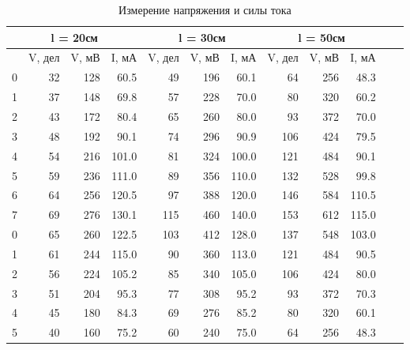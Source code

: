 \documentclass{article}
\begin{document}
\begin{table}[H]
    \label{tab:4}
    \begin{tabular}{|c|r|r|r|r|r|r|r|r|r|r|r|}
        \hline
        \multicolumn{4}{|c|}{l = 20см} & 
        \multicolumn{3}{|c|}{l = 30см} & 
        \multicolumn{3}{|c|}{l = 50см}                                                                            \\
        \hline
                                       & V, дел & V, мВ & I, мА & V, дел & V, мВ & I, мА & V, дел & V, мВ & I, мА \\
        \hline
        0                              & 32     & 128   & 60.5  & 49     & 196   & 60.1  & 64     & 256   & 48.3  \\
        1                              & 37     & 148   & 69.8  & 57     & 228   & 70.0  & 80     & 320   & 60.2  \\
        2                              & 43     & 172   & 80.4  & 65     & 260   & 80.0  & 93     & 372   & 70.0  \\
        3                              & 48     & 192   & 90.1  & 74     & 296   & 90.9  & 106    & 424   & 79.5  \\
        4                              & 54     & 216   & 101.0 & 81     & 324   & 100.0 & 121    & 484   & 90.1  \\
        5                              & 59     & 236   & 111.0 & 89     & 356   & 110.0 & 132    & 528   & 99.8  \\
        6                              & 64     & 256   & 120.5 & 97     & 388   & 120.0 & 146    & 584   & 110.5 \\
        7                              & 69     & 276   & 130.1 & 115    & 460   & 140.0 & 153    & 612   & 115.0 \\
        0                              & 65     & 260   & 122.5 & 103    & 412   & 128.0 & 137    & 548   & 103.0 \\
        1                              & 61     & 244   & 115.0 & 90     & 360   & 113.0 & 121    & 484   & 90.5  \\
        2                              & 56     & 224   & 105.2 & 85     & 340   & 105.0 & 106    & 424   & 80.0  \\
        3                              & 51     & 204   & 95.3  & 77     & 308   & 95.2  & 93     & 372   & 70.3  \\
        4                              & 45     & 180   & 84.3  & 69     & 276   & 85.2  & 80     & 320   & 60.1  \\
        5                              & 40     & 160   & 75.2  & 60     & 240   & 75.0  & 64     & 256   & 48.3  \\
        \hline
    \end{tabular}
    \caption{Измерение напряжения и силы тока}
\end{table}
\end{document}
